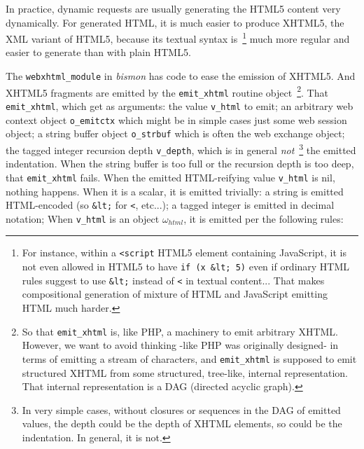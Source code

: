 In practice, dynamic requests are usually generating the HTML5
 content very dynamically. For generated HTML, it is much
easier to produce  XHTML5, the XML variant 
of HTML5, because its textual syntax is~\footnote{For instance, within
  a \texttt{<script} HTML5 element containing JavaScript, it is not
  even allowed in HTML5 to have \texttt{if (x \&lt; 5)} even if
  ordinary HTML rules suggest to use \texttt{\&lt;} instead of
  \texttt{<} in textual content... That makes compositional generation
  of mixture of HTML and JavaScript emitting HTML much harder.} much
more regular and easier to generate than with plain HTML5.

The \texttt{webxhtml\_module} 
in \emph{bismon} has code to ease the emission of XHTML5. And XHTML5
fragments are emitted by the \texttt{emit\_xhtml} routine
object~\footnote{So that \texttt{emit\_xhtml} is, like PHP, a
  machinery to emit arbitrary XHTML. However, we want to avoid
  thinking -like PHP was originally designed- in terms of emitting a
  stream of characters, and \texttt{emit\_xhtml} is supposed to emit
  structured XHTML from some structured, tree-like, internal
  representation. That internal representation is a DAG (directed
  acyclic graph).}. That \texttt{emit\_xhtml}, which get as arguments:
the value \texttt{v\_html} to emit; an arbitrary web context object
\texttt{o\_emitctx} which might be in simple cases just some web
session object; a string buffer object \texttt{o\_strbuf} which is
often the web exchange object; the tagged integer recursion depth
\texttt{v\_depth}, which is in general \emph{not}~\footnote{In very
  simple cases, without closures or sequences in the DAG of emitted
  values, the depth could be the depth of XHTML elements, so could be
  the indentation. In general, it is not.} the emitted
  indentation. When the string buffer is too full or the recursion
  depth is too deep, that \texttt{emit\_xhtml} fails. When the emitted
  HTML-reifying value \texttt{v\_html} is nil, nothing happens. When
  it is a scalar, it is emitted trivially: a string is emitted
  HTML-encoded (so \texttt{\&lt;} for \texttt{<}, etc...); a tagged
  integer is emitted in decimal notation; When \texttt{v\_html} is an
  object $\omega_{html}$, it is emitted per the following rules:

